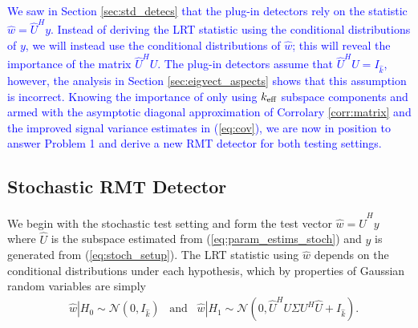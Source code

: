 \textcolor{blue}{We saw in Section \ref{sec:std_detecs} that the plug-in detectors rely on the statistic $\widehat{w}=\widehat{U}^Hy$. Instead of deriving the LRT statistic using the conditional distributions of $y$, we will instead use the conditional distributions of $\widehat{w}$; this will reveal the importance of the matrix $\widehat{U}^HU$. The plug-in detectors assume that $\widehat{U}^HU=I_{\widehat{k}}$, however, the analysis in Section \ref{sec:eigvect_aspects} shows that this assumption is incorrect. Knowing the importance of only using $k_\text{eff}$ subspace components and armed with the asymptotic diagonal approximation of Corrolary \ref{corr:matrix} and the improved signal variance estimates in (\ref{eq:cov}), we are now in position to answer Problem 1 and derive a new RMT detector for both testing settings.}

\subsection{Stochastic RMT Detector}\label{sec:rmt_stoch}

We begin with the stochastic test setting and form the test vector $\widehat{w}=\widehat{U}^Hy$ where $\widehat{U}$ is the subspace estimated from (\ref{eq:param_estims_stoch}) and $y$ is generated from (\ref{eq:stoch_setup}). The LRT statistic using $\widehat{w}$ depends on the conditional distributions under each hypothesis, which by properties of Gaussian random variables are simply
\begin{equation}\label{eq:stoch_distr}
\begin{aligned}
&\widehat{w}|H_0\sim\mathcal{N}\left(0,I_{\widehat{k}}\right)\,\,\,\text{ and }\,\,\,\widehat{w}|H_1\sim\mathcal{N}\left(0, \widehat{U}^HU\Sigma U^H\widehat{U} +I_{\widehat{k}}\right).\\
\end{aligned}
\end{equation}


